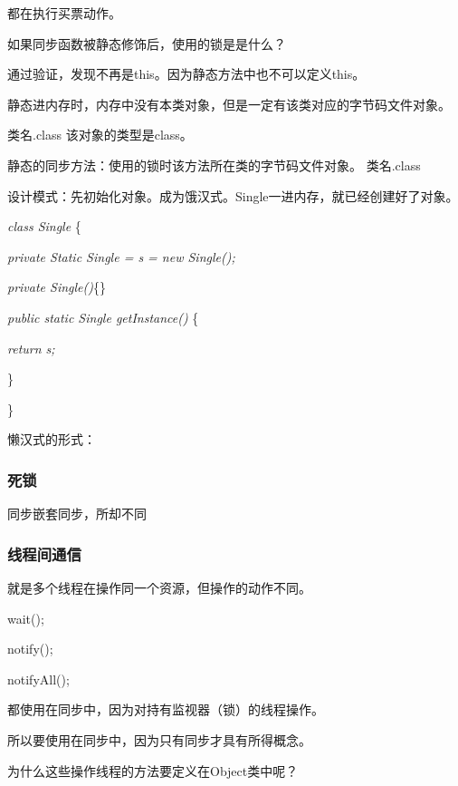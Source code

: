 \documentclass[UTF8]{ctexart}
\begin{document}
都在执行买票动作。



如果同步函数被静态修饰后，使用的锁是是什么？

通过验证，发现不再是this。因为静态方法中也不可以定义this。

静态进内存时，内存中没有本类对象，但是一定有该类对应的字节码文件对象。

类名.class 该对象的类型是class。

静态的同步方法：使用的锁时该方法所在类的字节码文件对象。 类名.class



设计模式：先初始化对象。成为饿汉式。Single一进内存，就已经创建好了对象。

\textit{class Single} \{

\qquad \textit{private Static Single = s = new Single();}

\qquad \textit{private Single()}\{\}

\qquad \textit{public static Single getInstance() }\{

\qquad \textit{return s;}

\qquad \}

\}

懒汉式的形式：


\subsubsection{死锁}

同步嵌套同步，所却不同



\subsubsection{线程间通信}

就是多个线程在操作同一个资源，但操作的动作不同。

wait();

notify();

notifyAll();

都使用在同步中，因为对持有监视器（锁）的线程操作。

所以要使用在同步中，因为只有同步才具有所得概念。

为什么这些操作线程的方法要定义在Object类中呢？
\end{document}

